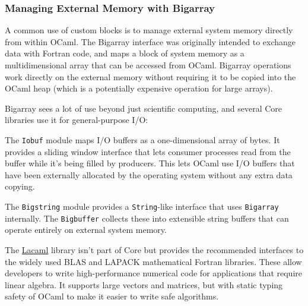 \hypertarget{managing-external-memory-with-bigarray}{%
\subsubsection{Managing External Memory with
Bigarray}\label{managing-external-memory-with-bigarray}}

A common use of custom blocks is to manage external system memory
directly from within OCaml. The Bigarray interface was originally
intended to exchange data with Fortran code, and maps a block of system
memory as a multidimensional array that can be accessed from OCaml.
Bigarray operations work directly on the external memory without
requiring it to be copied into the OCaml heap (which is a potentially
expensive operation for large arrays).

Bigarray sees a lot of use beyond just scientific computing, and several
Core libraries use it for general-purpose I/O:

\begin{description}
\tightlist
\item[\texttt{Iobuf}]
The \passthrough{\lstinline!Iobuf!} module maps I/O buffers as a
one-dimensional array of bytes. It provides a sliding window interface
that lets consumer processes read from the buffer while it's being
filled by producers. This lets OCaml use I/O buffers that have been
externally allocated by the operating system without any extra data
copying.
\item[\texttt{Bigstring}]
The \passthrough{\lstinline!Bigstring!} module provides a
\passthrough{\lstinline!String!}-like interface that uses
\passthrough{\lstinline!Bigarray!} internally. The
\passthrough{\lstinline!Bigbuffer!} collects these into extensible
string buffers that can operate entirely on external system memory.
\end{description}

The \href{http://mmottl.github.io/lacaml/}{Lacaml} library isn't part of
Core but provides the recommended interfaces to the widely used BLAS and
LAPACK mathematical Fortran libraries. These allow developers to write
high-performance numerical code for applications that require linear
algebra. It supports large vectors and matrices, but with static typing
safety of OCaml to make it easier to write safe algorithms. ~~
